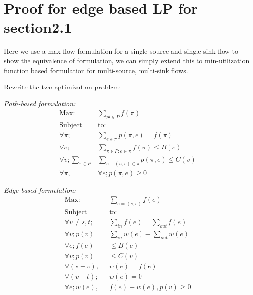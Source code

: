 \appendix
\section{Proof for edge based LP for section2.1}

Here we use a max flow formulation for a single source and single sink flow to show the equivalence of formulation, we can simply extend this to min-utilization function based formulation for multi-source, multi-sink flows. 

Rewrite the two optimization problem:


\begin{minipage}[t]{0.45\textwidth}
\textit{Path-based formulation:}
  \begin{subequations}
\begin{align}
\text{Max:}& \sum\limits_{pi\in P}f(\pi) \\  \nonumber
\text{Subject } &\text{to:} \\
\forall \pi; &\sum \limits_{e\in \pi} p(\pi, e) = f(\pi)\\
\forall e;& \sum \limits_{\pi\in P:e\in \pi} f(\pi) \leq B(e)\\
\forall v; \sum \limits_{\pi\in P} &\sum \limits_{ e\equiv (u,v)\in \pi} p(\pi, e) \leq C(v)\\
\forall \pi,&\forall e;p(\pi,e) \geq 0
\end{align}
\end{subequations}
  \end{minipage}
\hspace{0cm}
\begin{minipage}[t]{0.50\textwidth}
\textit{Edge-based formulation:}
  \begin{subequations}
\begin{align}
\text{Max:}&\sum \limits_{e=(s,v)} f(e)  \\ \nonumber
\text{Subject } &\text{to:}\\
\forall v \not= s,t;& \sum\limits_{in}  f(e)=  \sum\limits_{out} f(e)\\
\forall v ;p (v) =&  \sum\limits_{in} w (e) - \sum\limits_{out} w (e) \\
\forall e;  f(e)& \leq B(e)\\
\forall v;  p(v)& \leq C(v)\\
\forall (s-v);& w (e)= f (e)\\
\forall (v-t);& w (e)= 0\\
\forall e;w (e),& f (e)-w (e), p (v) \geq 0
\end{align}
\end{subequations}
\end{minipage}

